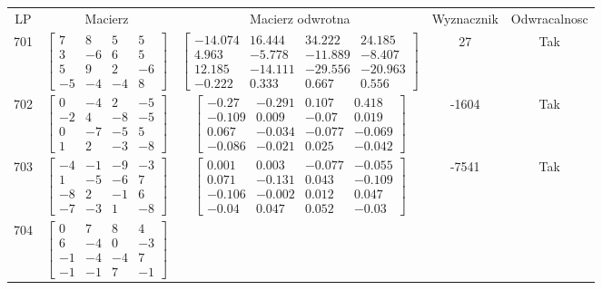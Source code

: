 \documentclass[a4paper,12pt]{article}
\begin{document}
\bgroup {} \vspace{0.2in} \begin{tabular}{c c c c c}
LP & Macierz & Macierz odwrotna & Wyznacznik & Odwracalnosc\\
701
&
$\begin{bmatrix} 7 & 8 & 5 & 5 \\ 3 & -6 & 6 & 5 \\ 5 & 9 & 2 & -6 \\ -5 & -4 & -4 & 8 \end{bmatrix}$
&
$\begin{bmatrix} -14.074 & 16.444 & 34.222 & 24.185 \\ 4.963 & -5.778 & -11.889 & -8.407 \\ 12.185 & -14.111 & -29.556 & -20.963 \\ -0.222 & 0.333 & 0.667 & 0.556 \end{bmatrix}$
&
27
&
Tak
\\
702
&
$\begin{bmatrix} 0 & -4 & 2 & -5 \\ -2 & 4 & -8 & -5 \\ 0 & -7 & -5 & 5 \\ 1 & 2 & -3 & -8 \end{bmatrix}$
&
$\begin{bmatrix} -0.27 & -0.291 & 0.107 & 0.418 \\ -0.109 & 0.009 & -0.07 & 0.019 \\ 0.067 & -0.034 & -0.077 & -0.069 \\ -0.086 & -0.021 & 0.025 & -0.042 \end{bmatrix}$
&
-1604
&
Tak
\\
703
&
$\begin{bmatrix} -4 & -1 & -9 & -3 \\ 1 & -5 & -6 & 7 \\ -8 & 2 & -1 & 6 \\ -7 & -3 & 1 & -8 \end{bmatrix}$
&
$\begin{bmatrix} 0.001 & 0.003 & -0.077 & -0.055 \\ 0.071 & -0.131 & 0.043 & -0.109 \\ -0.106 & -0.002 & 0.012 & 0.047 \\ -0.04 & 0.047 & 0.052 & -0.03 \end{bmatrix}$
&
-7541
&
Tak
\\
704
&
$\begin{bmatrix} 0 & 7 & 8 & 4 \\ 6 & -4 & 0 & -3 \\ -1 & -4 & -4 & 7 \\ -1 & -1 & 7 & -1 \end{bmatrix}$

\end{tabular}
\end{document}
